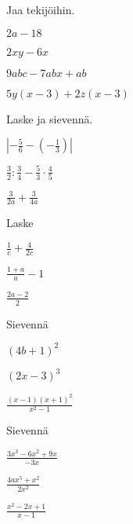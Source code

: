\begin{tehtava}
Jaa tekijöihin.
\begin{kohdat}
\item \(2a - 18\)
\item \(2xy - 6x\)
\item \(9abc - 7abx + ab\)
\item \(5y(x-3) + 2z(x-3)\)
\end{kohdat}
\end{tehtava}

\begin{tehtava}
Laske ja sievennä.
\begin{kohdat}
\item \(\displaystyle \left|-\frac{5}{6} - \left(-\frac{1}{3}\right)\right|\)
\item \(\displaystyle \frac{3}{2} : \frac{3}{4} - \frac{5}{3} \cdot \frac{4}{5}\)
\item \(\displaystyle \frac{3}{2a} + \frac{3}{4a}\)
\end{kohdat}
\end{tehtava}

\begin{tehtava}
Laske
\begin{kohdat}
\item \(\displaystyle \frac{1}{c} + \frac{4}{2c}\)
\item \(\displaystyle \frac{1+a}{a} - 1\)
\item \(\displaystyle \frac{2a - 2}{2}\)
\end{kohdat}
\end{tehtava}

\begin{tehtava}
Sievennä
\begin{kohdat}
\item \((4b+1)^2\)
\item \((2x-3)^3\)
\item \(\displaystyle \frac{(x-1)(x+1)^2}{x^2-1}\)
\end{kohdat}
\end{tehtava}

\begin{tehtava}
Sievennä
\begin{kohdat}
\item \(\displaystyle \frac{3x^3 - 6x^2 + 9x}{-3x}\)
\item \(\displaystyle \frac{4ax^5+x^2}{2x^2}\)
\item \(\displaystyle \frac{x^2 -2x + 1}{x-1}\)
\end{kohdat}
\end{tehtava}

